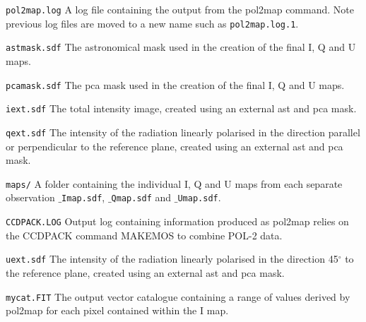 \begin{aligndesc}
\item[\texttt{pol2map.log}] 
A log file containing the output from the pol2map command. Note previous log files
are moved to a new name such as \texttt{pol2map.log.1}.

\item[\texttt{astmask.sdf}]
The astronomical mask used in the creation of the final I, Q and U maps.

\item[\texttt{pcamask.sdf}]
The pca mask used in the creation of the final I, Q and U maps.

\item[\texttt{iext.sdf}]
The total intensity image, created using an external ast and pca mask.

\item[\texttt{qext.sdf}]
The intensity of the radiation linearly polarised in the direction parallel
 or perpendicular to the reference plane, created using an external ast and pca mask.

\item[\texttt{maps/}]
A folder containing the individual I, Q and U maps from each separate observation 
\texttt{$\_$Imap.sdf}, \texttt{$\_$Qmap.sdf} and \texttt{$\_$Umap.sdf}.

\item[\texttt{CCDPACK.LOG}]
Output log containing information produced as pol2map relies on the CCDPACK command MAKEMOS
to combine POL-2 data.

\item[\texttt{uext.sdf}]
The intensity of the radiation linearly polarised in the direction 45$^{\circ }$ to the
reference plane, created using an external ast and pca mask.

\item[\texttt{mycat.FIT}]
The output vector catalogue containing a range of values derived by pol2map for each pixel
contained within the I map.

\end{aligndesc}







